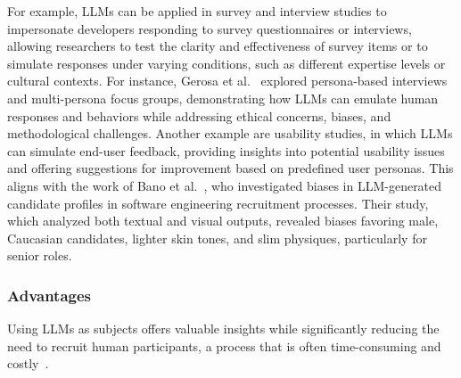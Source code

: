 For example, LLMs can be applied in survey and interview studies to impersonate developers responding to survey questionnaires or interviews, allowing researchers to test the clarity and effectiveness of survey items or to simulate responses under varying conditions, such as different expertise levels or cultural contexts. For instance, Gerosa et al.~\cite{DBLP:journals/ase/GerosaTSS24} explored persona-based interviews and multi-persona focus groups, demonstrating how LLMs can emulate human responses and behaviors while addressing ethical concerns, biases, and methodological challenges.
Another example are usability studies, in which LLMs can simulate end-user feedback, providing insights into potential usability issues and offering suggestions for improvement based on predefined user personas. This aligns with the work of Bano et al.~\cite{bano2025doessoftwareengineerlook}, who investigated biases in LLM-generated candidate profiles in software engineering recruitment processes. Their study, which analyzed both textual and visual outputs, revealed biases favoring male, Caucasian candidates, lighter skin tones, and slim physiques, particularly for senior roles.


\subsubsection{Advantages}

Using LLMs as subjects offers valuable insights while significantly reducing the need to recruit human participants, a process that is often time-consuming and costly~\cite{DBLP:conf/vl/Madampe0HO24}.

